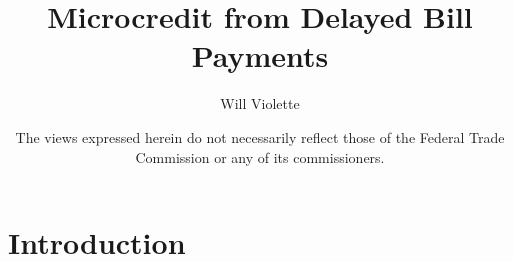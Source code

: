 \documentclass[aspectratio=149]{beamer}
\title{ Microcredit from Delayed Bill Payments } %
\author{Will Violette}
\date{\footnotesize The views expressed herein do not necessarily reflect those of the Federal Trade Commission or any of its commissioners.} %
\begin{document}
\beamertemplatenavigationsymbolsempty

\begin{frame}
\titlepage %
\end{frame}


\section{Introduction}




\end{document}
